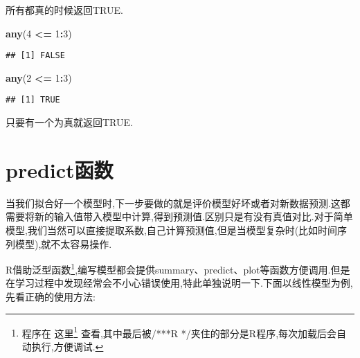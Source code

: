\documentclass[]{ctexbook}
\newenvironment{Shaded}{\begin{snugshade}}{\end{snugshade}}
\newcommand{\DecValTok}[1]{\textcolor[rgb]{0.00,0.00,0.81}{#1}}
\newcommand{\KeywordTok}[1]{\textcolor[rgb]{0.13,0.29,0.53}{\textbf{#1}}}
\newcommand{\NormalTok}[1]{#1}
\newcommand{\OperatorTok}[1]{\textcolor[rgb]{0.81,0.36,0.00}{\textbf{#1}}}
\newcommand{\StringTok}[1]{\textcolor[rgb]{0.31,0.60,0.02}{#1}}
\renewcommand{\href}[2]{#2\footnote{\url{#1}}}
\begin{document}
所有都真的时候返回TRUE.

\begin{Shaded}
\begin{Highlighting}[]
\KeywordTok{any}\NormalTok{(}\DecValTok{4} \OperatorTok{<=}\StringTok{ }\DecValTok{1}\OperatorTok{:}\DecValTok{3}\NormalTok{)}
\end{Highlighting}
\end{Shaded}

\begin{verbatim}
## [1] FALSE
\end{verbatim}

\begin{Shaded}
\begin{Highlighting}[]
\KeywordTok{any}\NormalTok{(}\DecValTok{2} \OperatorTok{<=}\StringTok{ }\DecValTok{1}\OperatorTok{:}\DecValTok{3}\NormalTok{)}
\end{Highlighting}
\end{Shaded}

\begin{verbatim}
## [1] TRUE
\end{verbatim}

只要有一个为真就返回TRUE.

\hypertarget{predict}{%
\section{predict函数}\label{predict}}

当我们拟合好一个模型时,下一步要做的就是评价模型好坏或者对新数据预测.这都需要将新的输入值带入模型中计算,得到预测值.区别只是有没有真值对比.对于简单模型,我们当然可以直接提取系数,自己计算预测值,但是当模型复杂时(比如时间序列模型),就不太容易操作.

R借助泛型函数\footnote{程序在 \href{\%22code/Rcpp-demo.cpp\%22}{这里} 查看,其中最后被/***R */夹住的部分是R程序,每次加载后会自动执行,方便调试.},编写模型都会提供summary、predict、plot等函数方便调用.但是在学习过程中发现经常会不小心错误使用,特此单独说明一下.下面以线性模型为例,先看正确的使用方法:
\end{document}
